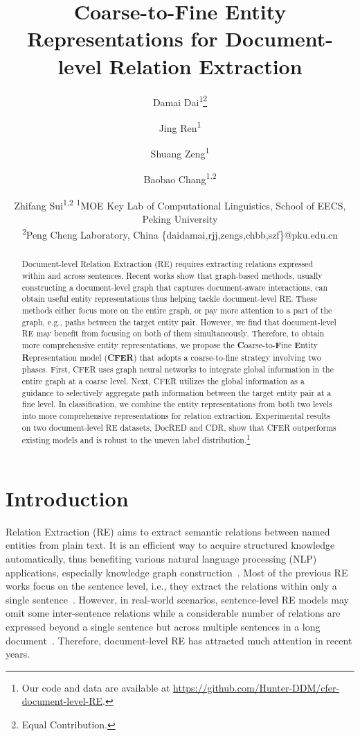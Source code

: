 \documentclass{article}
\title{Coarse-to-Fine Entity Representations for Document-level Relation Extraction}
\author{
    Damai Dai\textsuperscript{1}\thanks{Equal Contribution.}
    \and
    Jing Ren\textsuperscript{1}\footnotemark[1]
    \and
    Shuang Zeng\textsuperscript{1}
    \and
    Baobao Chang\textsuperscript{1,2}
    \and
    Zhifang Sui\textsuperscript{1,2}
    \affiliations
    \textsuperscript{1}MOE Key Lab of Computational Linguistics, School of EECS, Peking University \\
    \textsuperscript{2}Peng Cheng Laboratory, China
    \emails
    \{daidamai,rjj,zengs,chbb,szf\}@pku.edu.cn
}
\newcommand{\citep}{\cite}
\begin{document}
\maketitle

\begin{abstract}

Document-level Relation Extraction (RE) requires extracting relations expressed within and across sentences. 
Recent works show that graph-based methods, usually constructing a document-level graph that captures document-aware interactions, can obtain useful entity representations thus helping tackle document-level RE. 
These methods either focus more on the entire graph, or pay more attention to a part of the graph, e.g., paths between the target entity pair. 
However, we find that document-level RE may benefit from focusing on both of them simultaneously. 
Therefore, to obtain more comprehensive entity representations, we propose the \textbf{C}oarse-to-\textbf{F}ine \textbf{E}ntity \textbf{R}epresentation model (\textbf{CFER}) that adopts a coarse-to-fine strategy involving two phases. 
First, CFER uses graph neural networks to integrate global information in the entire graph at a coarse level. 
Next, CFER utilizes the global information as a guidance to selectively aggregate path information between the target entity pair at a fine level. 
In classification, we combine the entity representations from both two levels into more comprehensive representations for relation extraction. 
Experimental results on two document-level RE datasets, DocRED and CDR, show that CFER outperforms existing models and is robust to the uneven label distribution.\footnote{Our code and data are available at \url{https://github.com/Hunter-DDM/cfer-document-level-RE}. }

\end{abstract}

\section{Introduction}

Relation Extraction (RE) aims to extract semantic relations between named entities from plain text. 
It is an efficient way to acquire structured knowledge automatically, thus benefiting various natural language processing (NLP) applications, especially knowledge graph construction~\citep{scierc}. 
Most of the previous RE works focus on the sentence level, i.e., they extract the relations within only a single sentence~\citep{cnn_re,bilstm_re}. 
However, in real-world scenarios, sentence-level RE models may omit some inter-sentence relations while a considerable number of relations are expressed beyond a single sentence but across multiple sentences in a long document~\citep{docred}. 
Therefore, document-level RE has attracted much attention in recent years. 
\end{document}

